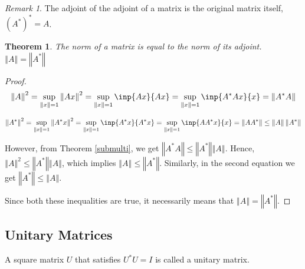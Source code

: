\documentclass[twofold]{article}
\newcommand*\adj[1]{#1^*}
\newcommand*\norm[1]{\left \Vert #1 \right\Vert}
\theoremstyle{plain}
\newtheorem{theorem}{Theorem}
\theoremstyle{definition}
\theoremstyle{remark}
\newtheorem*{remark}{Remark}
\begin{document}
\begin{remark} The adjoint of the adjoint of a matrix is the original matrix itself, \(\adj{(\adj{A})} = A\). \end{remark}




\begin{theorem} The norm of a matrix is equal to the norm of its adjoint. \(\norm{A} = \norm{\adj{A}}\) \end{theorem}
\begin{proof}
\[ \norm{A}^2   = \sup_{\norm{x} = 1} \norm{Ax}^2  = \sup_{\norm{x} = 1} \inp{Ax}{Ax}  = \sup_{\norm{x} = 1} \inp{\adj{A} A x}{x}  = \norm{\adj{A} A} \]

\[ \norm{\adj{A}}^2   = \sup_{\norm{x} = 1} \norm{\adj{A} x}^2  = \sup_{\norm{x} = 1} \inp{\adj{A}x}{\adj{A}x}  = \sup_{\norm{x} = 1} \inp{A \adj{A} x}{x}  = \norm{A \adj{A}} \le \norm{A} \norm{\adj{A}}\]

However, from Theorem \ref{submulti}, we get  \(\norm{\adj{A} A} \le \norm{\adj{A}} \norm{A}\). Hence, \(\norm{A}^2 \le \norm{\adj{A}} \norm{A}\), which implies  \(\norm{A} \le \norm{\adj{A}}\). Similarly, in the second equation we get \(\norm{\adj{A}} \le \norm{A}\). 

Since both these inequalities are true, it necessarily means that \(\norm{A} = \norm{\adj{A}}\).
\end{proof}


\subsection{Unitary Matrices}

A square matrix \(U\) that satisfies \(\adj{U} U = I\) is called a unitary matrix.
\end{document}
